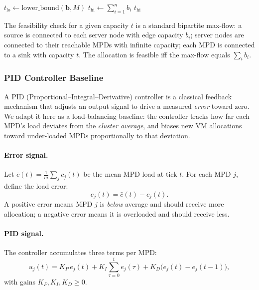 \documentclass[11pt]{article}
\begin{document}
\begin{algorithm}[H]
\SetAlgoLined
\DontPrintSemicolon
\caption{Optimal allocation via binary search on peak load.}
\label{alg:optimal}
\BlankLine
$t_{\mathrm{lo}} \leftarrow \text{lower\_bound}(\mathbf{b}, M)$\;
$t_{\mathrm{hi}} \leftarrow \sum_{i=1}^{n} b_i$\;
\Return $t_{\mathrm{hi}}$\;
\end{algorithm}

The feasibility check for a given capacity $t$ is a standard bipartite
max-flow: a source is connected to each server node with edge capacity
$b_i$; server nodes are connected to their reachable MPDs with infinite
capacity; each MPD is connected to a sink with capacity $t$.
The allocation is feasible iff the max-flow equals $\sum_i b_i$.

\subsubsection*{PID Controller Baseline}

A PID (Proportional--Integral--Derivative) controller is a classical
feedback mechanism that adjusts an output signal to drive a measured
\emph{error} toward zero.  We adapt it here as a load-balancing baseline:
the controller tracks how far each MPD's load deviates from the
\emph{cluster average}, and biases new VM allocations toward under-loaded
MPDs proportionally to that deviation.

\paragraph{Error signal.}
Let $\bar{c}(t) = \frac{1}{m}\sum_j c_j(t)$ be the mean MPD load at tick
$t$.  For each MPD $j$, define the load error:
\[
    e_j(t) = \bar{c}(t) - c_j(t).
\]
A positive error means MPD $j$ is \emph{below} average and should receive
more allocation; a negative error means it is overloaded and should receive
less.

\paragraph{PID signal.}
The controller accumulates three terms per MPD:
\[
    u_j(t) = K_P\, e_j(t)
           + K_I \sum_{\tau=0}^{t} e_j(\tau)
           + K_D \bigl(e_j(t) - e_j(t-1)\bigr),
\]
with gains $K_P, K_I, K_D \ge 0$.
\end{document}
